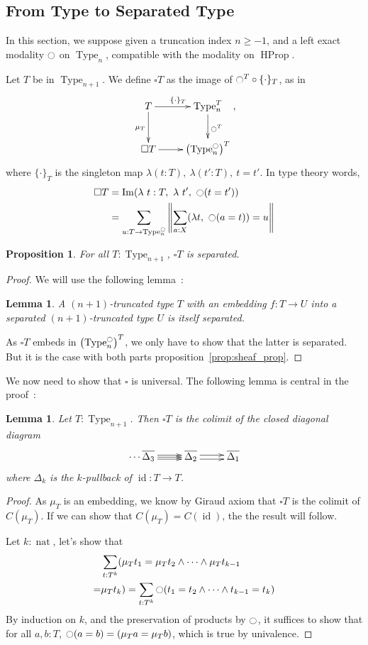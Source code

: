 \documentclass[conference]{IEEEtran}
\makeatletter
\newtheorem{prop}[thm]{Proposition}
\newtheorem{lem}[thm]{Lemma}
\def\dar[#1]{\ar@<2pt>[#1]\ar@<-2pt>[#1]}
\def\tar[#1]{\ar@<2pt>[#1]\ar@<0pt>[#1]\ar@<-2pt>[#1]}
\DeclareMathOperator{\Type}{Type}
\DeclareMathOperator{\HProp}{HProp}
\DeclareMathOperator{\nat}{nat}
\DeclareMathOperator{\im}{Im}
\DeclareMathOperator{\id}{id}
\newcommand{\modal}{\ensuremath{\ocircle}}
\makeatother
\begin{document}
\subsection{From Type to Separated Type}
\label{ssec:from-type-separated}
In this section, we suppose given a truncation index $n\geqslant -1$,
and a left exact modality $\modal$ on $\Type_n$, compatible with the
modality on $\HProp$.

Let $T$ be in $\Type_{n+1}$. We define $\square T$ as the image of
$\modal^T \circ \{\cdot\}_T$, as in
$$\xymatrix{
  T \ar[r]^{\{\cdot\}_T} \ar[d]_{\mu_T} & \Type_n^T \ar[d]^{\modal^T} \\
  \square T \ar[r]& \left( \Type_n^\modal \right)^T
}, $$
where $\{\cdot\}_T$ is the singleton map $\lambda (t:T),~\lambda
(t':T),~t=t'$.
In type theory words, 
\begin{align*}
\square T &= \im (\lambda~t:T,~\lambda~ t',~ \modal (t = t')) \\
          &= \sum_{u:T \to \Type_n^\modal} \left\| \sum_{a:X} 
            (\lambda t,~\modal (a=t)) = u\right\|
\end{align*}

\begin{prop}
  For all $T:\Type_{n+1}$, $\square T$ is separated.  
\end{prop}

\begin{proof}
We will use the following lemma~:
\begin{lem}
  A $(n+1)$-truncated type $T$ with an embedding $f : T \to U$
  into a separated $(n+1)$-truncated type $U$ is itself separated.
\end{lem}
As $\square T$ embeds in $\left( \Type_n^\modal \right)^T$, we only
have to show that the latter is separated. But it is the case with
both parts proposition~\ref{prop:sheaf_prop}.
\end{proof}

We now need to show that $\square$ is universal. The following
lemma is central in the proof~:
\begin{lem}
  Let $T:\Type_{n+1}$. Then $\square T$ is the colimit of the closed
  diagonal diagram
  $$\xymatrix{ 
    \cdots \overline{\Delta_3} \tar[r] & \overline{\Delta_2} \dar[r] &
    \overline{\Delta_1}
  }$$
where $\Delta_k$ is the $k$-pullback of $\id : T \to T$.
\end{lem}
\begin{proof}
  As $\mu_T$ is an embedding, we know by Giraud axiom that $\square T$ is the colimit
  of $C(\mu_T)$. If we can show that $C(\mu_T) = C(\id)$, the the
  result will follow. 

  Let $k:\nat$, let's show that 
\begin{align*}
  &\sum_{t:T^k} (\mu_T t_1 = \mu_T t_2 \land \cdots
    \land \mu_T t_{k-1} \\
  = &\mu_T t_k) = \sum_{t:T^k} \modal (t_1 = t_2 \land \cdots
  \land t_{k-1} = t_k)
\end{align*}
By induction on $k$, and the preservation of products by $\modal$, it
suffices to show that for all $a,b:T$, $\modal (a=b) = (\mu_T a =
\mu_T b)$, which is true by univalence.
\end{proof}
\end{document}
